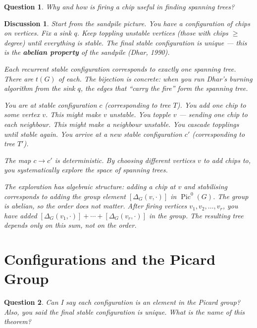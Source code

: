 \documentclass[11pt]{article}
\newcommand{\Pic}{\operatorname{Pic}^0}
\newtheorem{question}{Question}
\newtheorem{answer}{Discussion}
\begin{document}
\begin{question}
Why and how is firing a chip useful in finding spanning trees?
\end{question}

\begin{answer}
Start from the sandpile picture. You have a configuration of chips on
vertices. Fix a sink $q$. Keep toppling unstable vertices (those with chips
$\geq$ degree) until everything is stable. The final stable configuration is
unique --- this is the \textbf{abelian property} of the sandpile (Dhar, 1990).

Each recurrent stable configuration corresponds to exactly one spanning tree.
There are $t(G)$ of each. The bijection is concrete: when you run Dhar's
burning algorithm from the sink $q$, the edges that ``carry the fire'' form
the spanning tree.

You are at stable configuration $c$ (corresponding to tree $T$). You add one
chip to some vertex $v$. This might make $v$ unstable. You topple $v$ ---
sending one chip to each neighbour. This might make a neighbour unstable. You
cascade topplings until stable again. You arrive at a new stable configuration
$c'$ (corresponding to tree $T'$).

The map $c \to c'$ is deterministic. By choosing different vertices $v$ to add
chips to, you systematically explore the space of spanning trees.

The exploration has algebraic structure: adding a chip at $v$ and stabilising
corresponds to adding the group element $[\Delta_G(v, \cdot)]$ in $\Pic(G)$.
The group is abelian, so the order does not matter. After firing vertices
$v_1, v_2, \ldots, v_r$, you have added $[\Delta_G(v_1, \cdot)] + \cdots +
[\Delta_G(v_r, \cdot)]$ in the group. The resulting tree depends only on this
sum, not on the order.
\end{answer}


\section{Configurations and the Picard Group}

\begin{question}
Can I say each configuration is an element in the Picard group? Also, you
said the final stable configuration is unique. What is the name of this
theorem?
\end{question}
\end{document}
